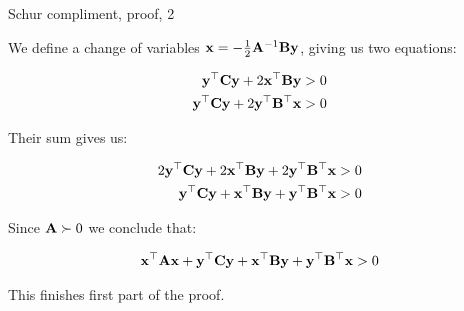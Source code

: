 \documentclass{beamer}
\begin{document}
	
	\begin{frame}{Schur compliment, proof, 2}
		\begin{flushleft}
			
			We define a change of variables $\mathbf{x} = - \frac{1}{2} \mathbf{A}^{-1}\mathbf{B} \mathbf{y}$, giving us two equations:
			
			\begin{align}
				\mathbf{y}^\top\mathbf{C}\mathbf{y}  + 2 \mathbf{x}^\top\mathbf{B} \mathbf{y} > 0 \\
				\mathbf{y}^\top\mathbf{C}\mathbf{y}  + 2 \mathbf{y}^\top\mathbf{B}^\top \mathbf{x} > 0 
			\end{align}
			
			Their sum gives us: 
			
			\begin{align}
				2 \mathbf{y}^\top\mathbf{C}\mathbf{y}  + 2 \mathbf{x}^\top\mathbf{B} \mathbf{y} + 2 \mathbf{y}^\top\mathbf{B}^\top \mathbf{x} > 0 \\
				\mathbf{y}^\top\mathbf{C}\mathbf{y}  + \mathbf{x}^\top\mathbf{B} \mathbf{y} + \mathbf{y}^\top\mathbf{B}^\top \mathbf{x} > 0
			\end{align}
			
			Since $\mathbf{A} \succ 0$ we conclude that:
			
			\begin{align}
				\mathbf{x}^\top\mathbf{A}  \mathbf{x} +
				\mathbf{y}^\top\mathbf{C}\mathbf{y}  + \mathbf{x}^\top\mathbf{B} \mathbf{y} + \mathbf{y}^\top\mathbf{B}^\top \mathbf{x} > 0
			\end{align}
			
			This finishes first part of the proof.
			
		\end{flushleft}
	\end{frame}
\end{document}
